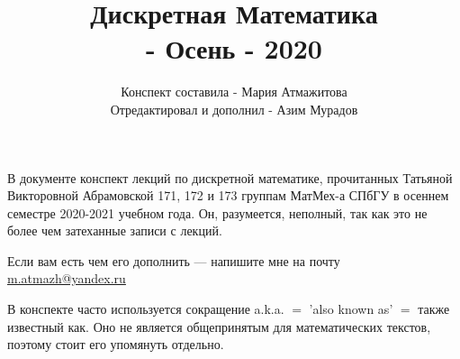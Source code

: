 \documentclass[a4paper,oneside,11pt,openany]{book}
\title{
    Дискретная Математика\\
    [1ex]
    \largeСеместр 1 - Осень - 2020
}
\author{
    Конспект составила - Мария Атмажитова\\
    Отредактировал и дополнил - Азим Мурадов
}
\begin{document}
    \maketitle

    В документе конспект лекций по дискретной математике, прочитанных Татьяной Викторовной Абрамовской 171, 172 и 173 группам МатМех-а СПбГУ в осеннем семестре 2020-2021 учебном года.
    Он, разумеется, неполный, так как это не более чем затеханные записи с лекций.

    Если вам есть чем его дополнить — напишите мне на почту \href{mailto:m.atmazh@yandex.ru}{m.atmazh@yandex.ru}

    В конспекте часто используется сокращение a.k.a. $=$ 'also known as' $=$ \guillemotleft также известный как\guillemotright.
    Оно не является общепринятым для математических текстов, поэтому стоит его упомянуть отдельно.

    \tableofcontents


\end{document}
